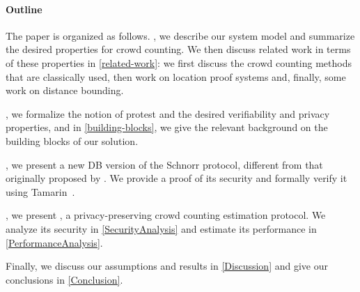 \paragraph*{Outline}

The paper is organized as follows.
, we describe our system model and summarize the desired 
properties for crowd counting.
We then discuss related work in terms of these properties in 
\cref{related-work}:
we first discuss the crowd counting methods that are classically used, then 
work on location proof systems and, finally, some work on distance bounding.

, we formalize the notion of protest and the desired 
verifiability and privacy properties, and in \cref{building-blocks}, we give 
the relevant background on the building blocks of our solution.

, we present a new \ac{DB} version of the Schnorr protocol, 
different from that originally proposed by \textcite{DistanceBounding}.
We provide a proof of its security and formally verify it using 
Tamarin~\cite{TamarinDB}.

, we present \CROCUS, a privacy-preserving crowd counting 
estimation protocol.
We analyze its security in \cref{SecurityAnalysis} and estimate its performance 
in \cref{PerformanceAnalysis}.

Finally, we discuss our assumptions and results in \cref{Discussion} and give 
our conclusions in \cref{Conclusion}.
